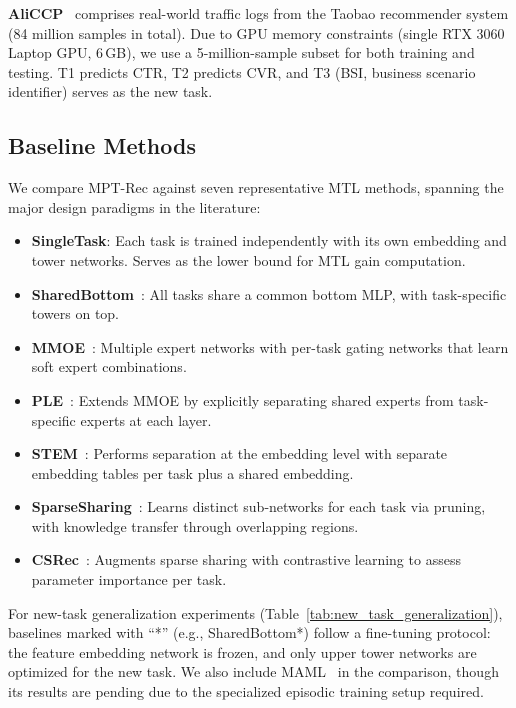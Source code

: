\documentclass[review,anonymous]{acmart}
\begin{document}
\textbf{AliCCP}~\cite{ma2018entire} comprises real-world traffic logs from the
Taobao recommender system (84 million samples in total). Due to GPU memory
constraints (single RTX 3060 Laptop GPU, 6\,GB), we use a 5-million-sample subset for both
training and testing. T1 predicts CTR, T2 predicts CVR, and T3 (BSI, business
scenario identifier) serves as the new task.

\subsection{Baseline Methods}

We compare MPT-Rec against seven representative MTL methods, spanning the
major design paradigms in the literature:

\begin{itemize}
  \item \textbf{SingleTask}: Each task is trained independently with its own
    embedding and tower networks. Serves as the lower bound for MTL gain
    computation.
  \item \textbf{SharedBottom}~\cite{ruder2017overview}: All tasks share a common
    bottom MLP, with task-specific towers on top.
  \item \textbf{MMOE}~\cite{ma2018modeling}: Multiple expert networks with
    per-task gating networks that learn soft expert combinations.
  \item \textbf{PLE}~\cite{tang2020progressive}: Extends MMOE by explicitly
    separating shared experts from task-specific experts at each layer.
  \item \textbf{STEM}~\cite{su2023stem}: Performs separation at the embedding
    level with separate embedding tables per task plus a shared embedding.
  \item \textbf{SparseSharing}~\cite{sun2020learning}: Learns distinct sub-networks
    for each task via pruning, with knowledge transfer through overlapping regions.
  \item \textbf{CSRec}~\cite{bai2022contrastive}: Augments sparse sharing with
    contrastive learning to assess parameter importance per task.
\end{itemize}

For new-task generalization experiments (Table~\ref{tab:new_task_generalization}),
baselines marked with ``*'' (e.g., SharedBottom*) follow a fine-tuning protocol:
the feature embedding network is frozen, and only upper tower networks are
optimized for the new task. We also include MAML~\cite{finn2017model} in the
comparison, though its results are pending due to the specialized episodic
training setup required.
\end{document}
